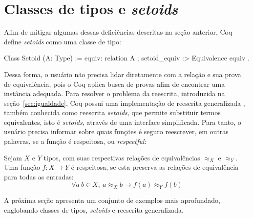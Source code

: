 \section{Classes de tipos e \textit{setoids}}\label{sec:classes-setoids}
Afim de mitigar algumas dessas deficiências descritas na seção anterior, Coq define \textit{setoids} como uma classe de tipo:
\begin{coqcode}
Class Setoid (A: Type) := {
   equiv: relation A ;
   setoid_equiv :> Equivalence equiv 
}.
\end{coqcode}
Dessa forma, o usuário não precisa lidar diretamente com a relação e sua prova de equivalência, pois o Coq aplica busca de provas afim de encontrar uma instância  adequada. Para resolver o problema da reescrita, introduzida na seção~\ref{sec:igualdade}, Coq possui uma implementação de reescrita generalizada \cite{Sozeau2009}, também conhecida como reescrita \textit{setoids}, que permite substituir termos equivalentes, isto é \textit{setoids}, através de uma interface simplificada. Para tanto, o usuário precisa informar sobre quais funções é seguro reescrever, em outras palavras, se a função é respeitosa, ou \textit{respectful}:
\begin{definicao}\label{def:respeitosa}
	Sejam $X$ e $Y$ tipos, com suas respectivas relações de equivalências $\approx_X$ e $\approx_Y$. Uma função $f: X \rightarrow Y$ é respeitosa, se esta preserva as relações de equivalência para todas as entradas:
	\begin{equation*}
		\forall a~b \in X,~a \approx_X b \rightarrow f(a) \approx_Y f(b)
	\end{equation*}
\end{definicao}\noindent
A próxima seção apresenta um conjunto de exemplos mais aprofundado, englobando classes de tipos, \textit{setoids} e reescrita generalizada.


